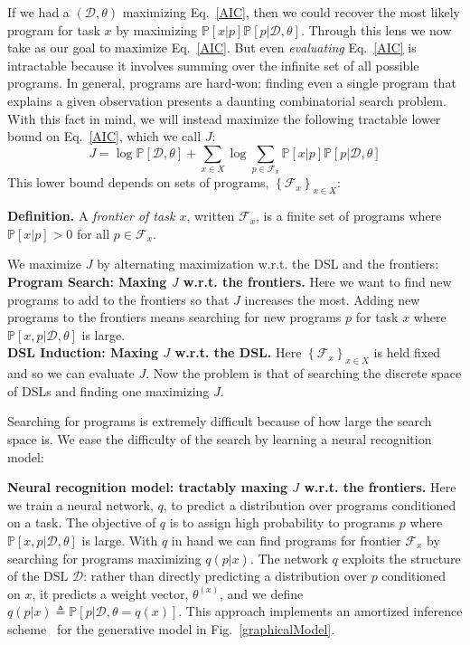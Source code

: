 \documentclass{article}
\newcommand{\system}{\textsc{HelmholtzHacker}~}
\newcommand{\probability}{\mathds{P}} %
\begin{document}
If we had a $(\mathcal{D},\theta)$ maximizing Eq.~\ref{AIC}, then we could recover the most likely program for task $x$ by maximizing $\probability[x|p] \probability[p|\mathcal{D},\theta]$.
Through this lens we now take as our goal to maximize Eq.~\ref{AIC}.
But even \emph{evaluating} Eq.~\ref{AIC} is intractable because it involves summing over the infinite set of all possible programs. In general, programs are hard-won: finding even a single program that explains a given observation presents a daunting combinatorial search problem.
With this fact in mind, we will instead maximize the following tractable lower bound on Eq.~\ref{AIC},
which we call $J$:
\begin{equation}
J = \log \probability[\mathcal{D},\theta] + \sum_{x\in X}\log \sum_{p\in \mathcal{F}_x} \probability[x|p]\probability[p|\mathcal{D},\theta]\label{lowerBound}
\end{equation}
This lower bound depends on sets of programs, $\left\{\mathcal{F}_x \right\}_{x\in X}$:

\noindent\textbf{Definition.} A \emph{frontier of task $x$}, written $\mathcal{F}_x$,
is a finite set of programs where $\probability[x|p] > 0$ for all $p\in \mathcal{F}_x$.

We maximize $J$ by alternating maximization w.r.t. the DSL and the frontiers:
\\\noindent \textbf{Program Search: Maxing $J$ w.r.t. the frontiers.} Here we
want to find new programs to add to  the frontiers so that $J$ increases the most.
Adding new programs to the frontiers means searching for new programs $p$ for task $x$
where $\probability[x,p|\mathcal{D},\theta]$ is large.
\\\noindent \textbf{DSL Induction: Maxing $J$ w.r.t. the DSL.} Here $\left\{\mathcal{F}_x \right\}_{x\in X}$ is held fixed and so we can evaluate $J$. Now the problem is that of searching the discrete space of DSLs and finding one maximizing $J$.

Searching for programs is extremely difficult because
of how large the search space is. We ease the difficulty of the search by learning a neural recognition model:

\textbf{Neural recognition model: tractably maxing $J$ w.r.t. the
  frontiers.}  Here we train a neural network, $q$, to predict a
distribution over programs conditioned on a task. The objective of $q$
is to assign high probability to programs $p$ where
$\probability[x,p|\mathcal{D},\theta]$ is large.  With $q$ in hand we can find programs for
frontier $\mathcal{F}_x$ by searching for programs maximizing
$q(p|x)$.
The network $q$ exploits the structure of the DSL $\mathcal{D}$:
rather than directly predicting a distribution over $p$ conditioned on $x$,
it predicts a weight vector, $\theta^{(x)}$, and we define $q(p|x)\triangleq \probability[p|\mathcal{D},\theta = q(x)]$.
This approach implements an amortized
inference scheme~\cite{ritchie2016deep} for the generative model in
Fig.~\ref{graphicalModel}.
\end{document}
